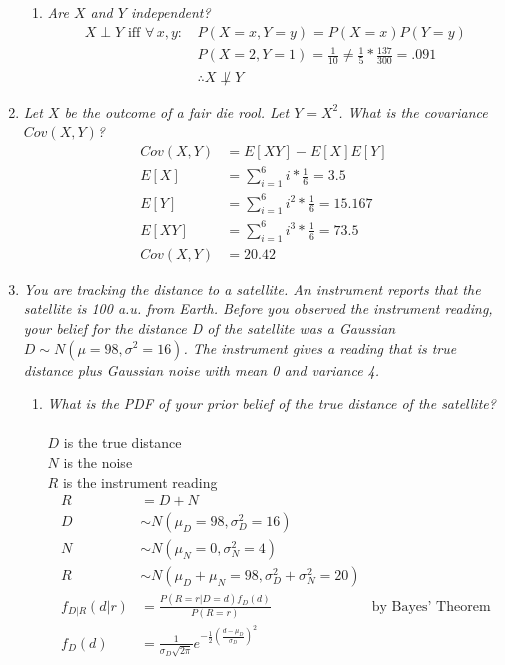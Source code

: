 \documentclass{article} %
\begin{document}
\begin{enumerate}
\begin{enumerate}
		\item \textit{Are $X$ and $Y$ independent?}
		\begin{align*}
		X \perp Y \text{ iff } \forall \, x, y: \, &P(X = x, Y = y) = P(X = x)P(Y = y)\\
		&P(X = 2, Y = 1) = \frac{1}{10} \neq \frac{1}{5} * \frac{137}{300} = .091\\
		&\therefore X \not \perp Y
		\end{align*}
		
	\end{enumerate}
	
	\item \textit{Let $X$ be the outcome of a fair die rool. Let $Y = X^2$. What is the covariance $Cov(X, Y)$?}
	\begin{align*}
	Cov(X, Y) &= E[XY] - E[X]E[Y]\\
	E[X] &= \sum_{i = 1}^{6} i * \frac{1}{6} = 3.5\\
	E[Y] &= \sum_{i = 1}^{6} i^2 * \frac{1}{6} = 15.167\\
	E[XY] &= \sum_{i = 1}^{6} i^3 * \frac{1}{6} = 73.5\\
	Cov(X, Y) &= 20.42
	\end{align*}
	
	\item \textit{You are tracking the distance to a satellite. An instrument reports that the satellite is 100 a.u. from Earth. Before you observed the instrument reading, your belief for the distance D of the satellite was a Gaussian $D \sim N(\mu = 98, \sigma^2 = 16)$. The instrument gives a reading that is true distance plus Gaussian noise with mean 0 and variance 4.}
	\begin{enumerate}
		\item \textit{What is the PDF of your prior belief of the true distance of the satellite?}\\
		\\
		$D$ is the true distance\\
		$N$ is the noise\\
		$R$ is the instrument reading
		\begin{align*}
		R &= D + N\\
		D &\sim N(\mu_D = 98, \sigma_D^2 = 16)\\
		N &\sim N(\mu_N = 0, \sigma_N^2 = 4)\\
		R &\sim N(\mu_D + \mu_N = 98, \sigma_D^2 + \sigma_N^2 = 20)\\
		f_{D|R}(d | r) &= \frac{P(R = r | D = d)f_D(d)}{P(R = r)} &\text{by Bayes' Theorem}\\
		f_D(d) &= \frac{1}{\sigma_D \sqrt{2 \pi}} e^{-\frac{1}{2}(\frac{d - \mu_D}{\sigma_D})^2}
		\end{align*}
		

\end{enumerate}
\end{enumerate}
\end{document}
